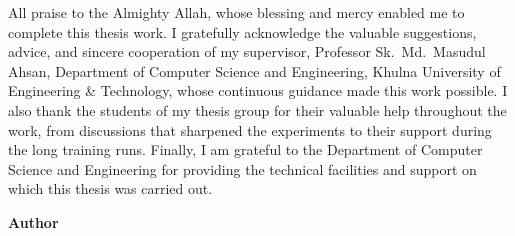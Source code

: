
All praise to the Almighty Allah, whose blessing and mercy enabled me to
complete this thesis work. I gratefully acknowledge the valuable suggestions,
advice, and sincere cooperation of my supervisor,
Professor Sk.\ Md.\ Masudul Ahsan, Department of Computer Science and
Engineering, Khulna University of Engineering \& Technology, whose continuous
guidance made this work possible. I also thank the students of my thesis
group for their valuable help throughout the work, from discussions that
sharpened the experiments to their support during the long training runs.
Finally, I am grateful to the Department of Computer Science and Engineering
for providing the technical facilities and support on which this thesis was
carried out.

\vspace{2\baselineskip}
\begin{flushright}
\textbf{Author}
\end{flushright}
\clearpage
